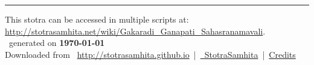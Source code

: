 \documentclass[oneside,12pt]{book}
\begin{document}
\setmainfont[Script=Devanagari,Mapping=tex-text]{Sanskrit 2003}
\fontsize {16}{19.25}\selectfont
\begin{center}

\end{center}
\vfill
\centering
\rule{0.8\textwidth}{0.6pt}

\footnotesize
{}\sffamily
This stotra can be accessed in multiple scripts at:\\
\url{http://stotrasamhita.net/wiki/Gakaradi_Ganapati_Sahasranamavali}.\\[1ex]
\faFilePdfO~generated on \textbf{\today}\\[1ex]
Downloaded from \faGlobe{}~\url{http://stotrasamhita.github.io}~|~\href{https://github.com/StotraSamhita}{\faGithubSquare{}~StotraSamhita}~|~\href{https://stotrasamhita.github.io/about/}{Credits}
\end{document}

